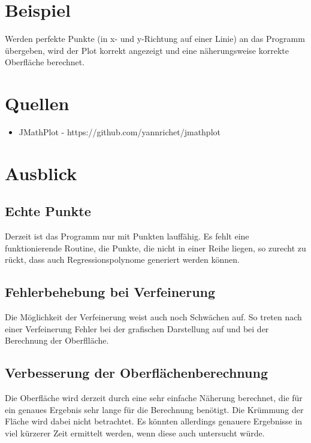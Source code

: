 \documentclass[11pt, bibliography=totocnumbered]{scrartcl}
\begin{document}
\section{Beispiel}
Werden perfekte Punkte (in x- und y-Richtung auf einer Linie) an das Programm \"ubergeben, wird der Plot korrekt angezeigt und eine n\"aherungsweise korrekte Oberfl\"ache berechnet.
\section{Quellen}
\begin{itemize}
\item JMathPlot - https://github.com/yannrichet/jmathplot
\end{itemize}

\section{Ausblick}
\subsection{Echte Punkte}
Derzeit ist das Programm nur mit  Punkten lauff\"ahig. Es fehlt eine funktionierende Routine, die Punkte, die nicht in einer Reihe liegen, so zurecht zu r\"uckt, dass auch Regressionspolynome generiert werden k\"onnen.
\subsection{Fehlerbehebung bei Verfeinerung}
Die M\"oglichkeit der Verfeinerung weist auch noch Schw\"achen auf. So treten nach einer Verfeinerung Fehler bei der grafischen Darstellung auf und bei der Berechnung der Oberfll\"ache.
\subsection{Verbesserung der Oberfl\"achenberechnung}
Die Oberfl\"ache wird derzeit durch eine sehr einfache N\"aherung berechnet, die f\"ur ein genaues Ergebnis sehr lange f\"ur die Berechnung ben\"otigt. Die Kr\"ummung der Fl\"ache wird dabei nicht betrachtet. Es k\"onnten allerdings genauere Ergebnisse in viel k\"urzerer Zeit ermittelt werden, wenn diese auch untersucht w\"urde. 
\end{document}

